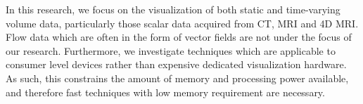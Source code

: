 In this research, we focus on the visualization of both static and time-varying volume data, particularly those scalar data acquired from CT, MRI and 4D MRI. Flow data which are often in the form of vector fields are not under the focus of our research.
Furthermore, we investigate techniques which are applicable to consumer level devices rather than expensive dedicated visualization hardware. As such, this constrains the amount of memory and processing power available, and therefore fast techniques with low memory requirement are necessary.

%
%	
